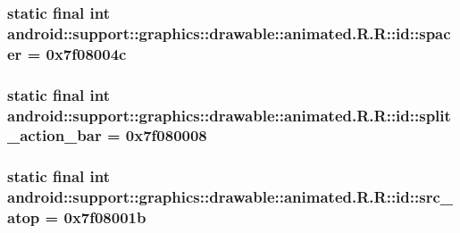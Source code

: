\hypertarget{classandroid_1_1support_1_1graphics_1_1drawable_1_1animated_1_1_r_1_1id_c68f3aca9eb976d222bb51701e7f8ee0}{
\subsubsection[{spacer}]{\setlength{\rightskip}{0pt plus 5cm}static final int android::support::graphics::drawable::animated.R.R::id::spacer = 0x7f08004c}}
\label{classandroid_1_1support_1_1graphics_1_1drawable_1_1animated_1_1_r_1_1id_c68f3aca9eb976d222bb51701e7f8ee0}


\hypertarget{classandroid_1_1support_1_1graphics_1_1drawable_1_1animated_1_1_r_1_1id_b7ad6d0ba025201d498953100bcee167}{
\subsubsection[{split\_\-action\_\-bar}]{\setlength{\rightskip}{0pt plus 5cm}static final int android::support::graphics::drawable::animated.R.R::id::split\_\-action\_\-bar = 0x7f080008}}
\label{classandroid_1_1support_1_1graphics_1_1drawable_1_1animated_1_1_r_1_1id_b7ad6d0ba025201d498953100bcee167}


\hypertarget{classandroid_1_1support_1_1graphics_1_1drawable_1_1animated_1_1_r_1_1id_624d89dae66fe75a2dd7eb2e59089e4d}{
\subsubsection[{src\_\-atop}]{\setlength{\rightskip}{0pt plus 5cm}static final int android::support::graphics::drawable::animated.R.R::id::src\_\-atop = 0x7f08001b}}
\label{classandroid_1_1support_1_1graphics_1_1drawable_1_1animated_1_1_r_1_1id_624d89dae66fe75a2dd7eb2e59089e4d}


